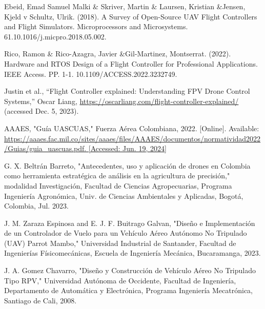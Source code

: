\begin{thebibliography}{20}

    Ebeid, Emad Samuel Malki \& Skriver, Martin \& Laursen, Kristian \&Jensen, Kjeld v Schultz, Ulrik. (2018). A Survey of Open-Source UAV Flight Controllers and Flight Simulators. Microprocessors and Microsystems. 61.10.1016/j.micpro.2018.05.002. 
    
    Rico, Ramon \& Rico-Azagra, Javier \&Gil-Martinez, Montserrat. (2022). Hardware and RTOS Design of a Flight Controller for Professional Applications. IEEE Access. PP. 1-1. 10.1109/ACCESS.2022.3232749. 
    
     Justin et al., “Flight Controller explained: Understanding FPV Drone Control Systems,” Oscar Liang, \url{https://oscarliang.com/flight-controller-explained/} (accessed Dec. 5, 2023). 
    
    AAAES, "Guía UASCUAS," Fuerza Aérea Colombiana, 2022. [Online]. Available: \url{https://aaaes.fac.mil.co/sites/aaaes/files/AAAES/documentos/normatividad2022/Guias/guia_uascuas.pdf. [Accessed: Jun. 19, 2024]}
    
     G. X. Beltrán Barreto, "Antecedentes, uso y aplicación de drones en Colombia como herramienta estratégica de análisis en la agricultura de precisión," modalidad Investigación, Facultad de Ciencias Agropecuarias, Programa Ingeniería Agronómica, Univ. de Ciencias Ambientales y Aplicadas, Bogotá, Colombia, Jul. 2023.
    
    
    
     J. M. Zaraza Espinosa and E. J. F. Buitrago Galvan, "Diseño e Implementación de un Controlador de Vuelo para un Vehículo Aéreo Autónomo No Tripulado (UAV) Parrot Mambo," Universidad Industrial de Santander, Facultad de Ingenierías Físicomecánicas, Escuela de Ingeniería Mecánica, Bucaramanga, 2023.
    
    J. A. Gomez Chavarro, "Diseño y Construcción de Vehículo Aéreo No Tripulado Tipo RPV," Universidad Autónoma de Occidente, Facultad de Ingeniería, Departamento de Automática y Electrónica, Programa Ingeniería Mecatrónica, Santiago de Cali, 2008.
    

\end{thebibliography}
